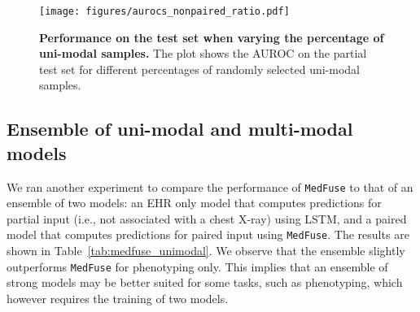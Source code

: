 \documentclass[pmlr]{jmlr}
\begin{document}
\begin{figure}[h!]
    \centering
\texttt{[image: figures/aurocs\_nonpaired\_ratio.pdf]}
         \caption{\small\textbf{Performance on the test set when varying the percentage of uni-modal samples.} The plot shows the AUROC on the partial test set for different percentages of randomly selected uni-modal samples.}
         \label{fig:data_ratio_pairtial_testset}
    \vspace{-4mm}
\end{figure}






\subsection{Ensemble of uni-modal and multi-modal models} \label{ensemble}
We ran another experiment to compare the performance of \texttt{MedFuse} to that of an ensemble of two models: an EHR only model that computes predictions for partial input (i.e., not associated with a chest X-ray) using LSTM, and a paired model that computes predictions for paired input using \texttt{MedFuse}. The results are shown in Table~\ref{tab:medfuse_unimodal}. We observe that the ensemble slightly outperforms \texttt{MedFuse} for phenotyping only. This implies that an ensemble of strong models may be better suited for some tasks, such as phenotyping, which however requires the training of two models. 


\begin{table*}[h!]
    \centering
    \caption{\textbf{MedFuse compared to an ensemble evaluation.} We report the AUROC and AUPRC results on the partially paired test set.} \vspace{-1mm}
    \label{tab:medfuse_unimodal}
\end{table*}
\end{document}
